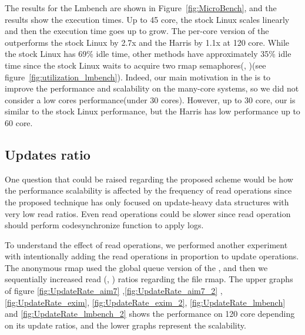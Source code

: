 The results for the Lmbench are shown in Figure~\ref{fig:MicroBench}, 
and the results show the execution times.
Up to 45 core, the stock Linux scales linearly and then the execution time goes
up to grow.
The per-core version of the \LDU outperforms the stock Linux by 2.7x and the Harris by
1.1x at 120 core.
While the stock Linux has 69\% idle time, other methods have approximately 35\%
idle time since the stock Linux waits to acquire two rmap
semaphores(, )(see
figure~\ref{fig:utilization_lmbench}).
Indeed, our main motivation in the \LDU is to improve the performance and scalability on
the many-core systems, so we did not consider a low cores performance(under 30 cores).
However, up to 30 core, our \LDU is similar to the stock Linux performance, but
the Harris has low performance up to 60 core.

\subsection{Updates ratio}

One question that could be raised regarding the proposed
\LDU scheme would be how the performance scalability is affected
by the frequency of read operations since the proposed technique
has only focused on update-heavy data structures with very low
read ratios.
Even read operations could be slower since read operation should
perform code{synchronize} function to apply logs.

To understand the effect of read operations, we performed another experiment with intentionally adding the read operations in proportion to update operations.
The anonymous rmap used the global queue version of the \LDU, and then we sequentially increased read (,
) ratios regarding the file rmap.
The upper graphs of figure \ref{fig:UpdateRate_aim7} 
,\ref{fig:UpdateRate_aim7_2} ,  \ref{fig:UpdateRate_exim}, 
\ref{fig:UpdateRate_exim_2},  \ref{fig:UpdateRate_lmbench} and
\ref{fig:UpdateRate_lmbench_2} shows the performance on 120 core depending on
its update ratios, and the lower graphs represent the scalability.

